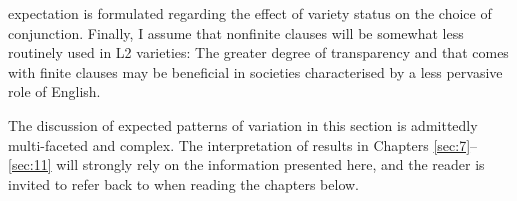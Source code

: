 expectation is formulated regarding the effect of variety status on the choice of conjunction. Finally, I assume that nonfinite clauses will be somewhat less routinely used in L2 varieties: The greater degree of transparency and  that comes with finite clauses may be beneficial in societies characterised by a less pervasive role of English.

  The discussion of expected patterns of variation in this section is admittedly multi-faceted and complex. The interpretation of results in Chapters \ref{sec:7}–\ref{sec:11} will strongly rely on the information presented here, and the reader is invited to refer back to  when reading the chapters below.

